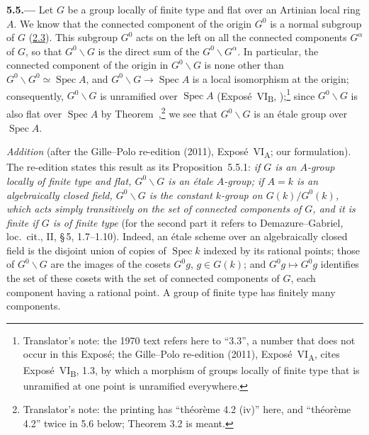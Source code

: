 
\medskip
{}\label{par:sga3-VIA-5.5}%
\noindent\textbf{5.5.---}
Let \(G\) be a group locally of finite type and flat over an Artinian
local ring \(A\). We know that the connected component of the origin
\(G^0\) is a normal subgroup of \(G\) (\hyperref[par:sga3-VIA-2.3]{2.3}). This subgroup \(G^0\)
acts on the left on all the connected components \(G^\alpha\) of \(G\),
so that \(G^0\backslash G\) is the direct sum of the
\(G^0\backslash G^\alpha\). In particular, the connected component of
the origin in \(G^0\backslash G\) is none other than
\(G^0\backslash G^0\simeq\operatorname{Spec}A\), and
\(G^0\backslash G\to\operatorname{Spec}A\) is a local isomorphism at the
origin; consequently, \(G^0\backslash G\) is unramified over
\(\operatorname{Spec}A\) (Expos\'e~VI\textsubscript{B}, );\footnote{Translator's note: the 1970 text refers here to ``3.3'', a
number that does not occur in this Exposé; the Gille--Polo re-edition (2011), Exposé~VI\textsubscript{A},
cites Exposé~VI\textsubscript{B}, 1.3, by which a morphism of groups locally of finite type that is
unramified at one point is unramified everywhere.} since \(G^0\backslash G\) is
also flat over \(\operatorname{Spec}A\) by Theorem~,\footnote{Translator's note: the printing has ``théorème 4.2 (iv)'' here, and
``théorème 4.2'' twice in 5.6 below; Theorem 3.2 is meant.} we see that
\(G^0\backslash G\) is an \'etale group over \(\operatorname{Spec}A\).

\medskip\noindent
\emph{Addition} (after the Gille--Polo re-edition (2011), Exposé~VI\textsubscript{A}; our
formulation). The re-edition states this result as its Proposition~5.5.1:
\label{prop:sga3-VIA-5.5.1}%
\emph{if \(G\) is an \(A\)-group locally of finite type and flat, \(G^0\backslash G\) is an étale
\(A\)-group; if \(A=k\) is an algebraically closed field, \(G^0\backslash G\) is the constant
\(k\)-group on \(G(k)/G^0(k)\), which acts simply transitively on the set of connected components of
\(G\), and it is finite if \(G\) is of finite type} (for the second part it refers to Demazure--Gabriel,
loc.\ cit., II, \S\,5, 1.7--1.10). Indeed, an étale scheme over an algebraically closed field is the
disjoint union of copies of \(\operatorname{Spec}k\) indexed by its rational points; those of
\(G^0\backslash G\) are the images of the cosets \(G^0g\), \(g\in G(k)\); and
\(G^0g\mapsto G^0g\) identifies the set of these cosets with the set of connected components of \(G\),
each component having a rational point. A group of finite type has finitely many components.

